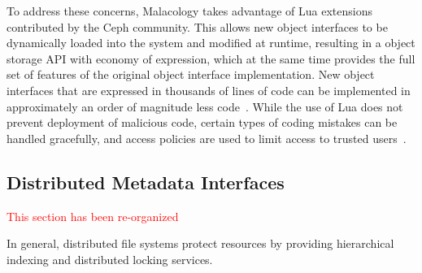 To address these concerns, Malacology takes advantage of Lua extensions
contributed by the Ceph community. This allows new object interfaces to be
dynamically loaded into the system and modified at runtime, resulting in a
object storage API with economy of expression, which at the same time provides
the full set of features of the original object interface implementation. New object interfaces that
are expressed in thousands of lines of code can be implemented in approximately
an order of magnitude less code~\cite{geambasu_comet_2010}. While the use of
Lua does not prevent deployment of malicious code, certain types of coding
mistakes can be handled gracefully, and access policies are used to limit
access to trusted users~\cite{ierusalimschy1996lua}.

 

\subsection{Distributed Metadata Interfaces}
\begin{notes}
\textcolor{red}{This section has been re-organized}
\end{notes}
\label{sec:distributed-metadata-interfaces}
\label{malacology:mds}

 
In general, distributed file systems protect resources by providing
hierarchical indexing and distributed locking services.  


